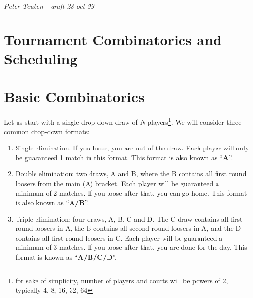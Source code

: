 

\setlength{\parindent}{0pt}
\setlength{\parskip}{2.5mm}






\begin{center}
{\it Peter Teuben - draft 28-oct-99}
\end{center}

\section*{Tournament Combinatorics and Scheduling}



\section*{Basic Combinatorics}

Let us start with a single drop-down draw of $N$ 
players\footnote{for sake of simplicity, number of players and
courts will be  powers of 2, typically 4, 8, 16, 32, 64}. 
We will consider three common drop-down formats:

\begin{enumerate}
\item
Single elimination. If you loose, you are out of the draw. 
Each player will only be guaranteed 1 match in this format.
\newline
This format is also known as ``{\bf A}''.

\item
Double elimination: two draws, A and B, 
where the B contains all first round loosers from the main (A) bracket.
Each player will be guaranteed a minimum of 2 matches.
If you loose after that, you can go home.
\newline
This format is also known as ``{\bf A/B}''.

\item
Triple elimination: four draws, A, B, C and D. The C draw 
contains all first
round loosers in A, the B contains all second round loosers in A, and the 
D contains all first round loosers in C. 
Each player will be guaranteed a minimum of 3 matches.
If you loose after that, you are done for the day.
\newline
This format is known as ``{\bf A/B/C/D}''.
\end{enumerate}

